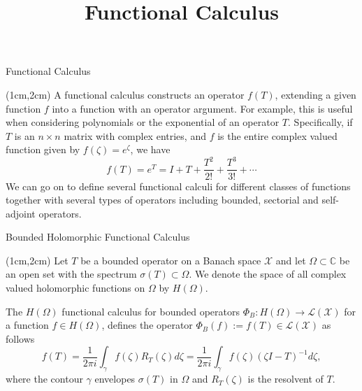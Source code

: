 \documentclass{beamer}
\title{Functional Calculus}
\author{}
\date{}
\begin{document}

\begin{frame}{Functional Calculus}

\begin{textblock*}{11cm}(1cm,2cm)
A functional calculus constructs an operator $f(T)$, extending a given function $f$ into a function with an operator argument. For example, this is useful when considering polynomials or the exponential of an operator $T$. Specifically, if $T$ is an $n\times n$ matrix with complex entries, and $f$ is the entire complex valued function given by $f(\zeta)=e^{\zeta}$, we have $$f(T)=e^{T}=I+T+\frac{T^{2}}{2!}+\frac{T^{3}}{3!}+\cdots$$
We can go on to define several functional calculi for different classes of functions together with several types of operators including bounded, sectorial and self-adjoint operators.
\end{textblock*}
\end{frame}

\logo{}


\begin{frame}{Bounded Holomorphic Functional Calculus}
\begin{textblock*}{11cm}(1cm,2cm)
Let $T$ be a bounded operator on a Banach space $\mathcal{X}$ and let $\Omega\subset\mathbb{C}$ be an open set with the spectrum $\sigma(T)\subset\Omega$. We denote the space of all complex valued holomorphic functions on $\Omega$ by $H(\Omega)$. 
\begin{block}{}
The $H(\Omega)$ functional calculus for bounded operators $\Phi_{B}\colon H(\Omega)\to\mathcal{L}(\mathcal{X})$ for a function $f\in H(\Omega)$, defines the operator $\Phi_{B}(f):=f(T)\in\mathcal{L}(\mathcal{X})$ as follows $$f(T) = \frac{1}{2\pi i}\int_{\gamma}f(\zeta)R_{T}(\zeta)d\zeta = \frac{1}{2\pi i}\int_{\gamma}f(\zeta)(\zeta I - T)^{-1}d\zeta,$$ where the contour $\gamma$ envelopes  $\sigma(T)$ in $\Omega$ and $R_{T}(\zeta)$ is the resolvent of $T$.
\end{block}
\end{textblock*}
\end{frame}
\end{document}
